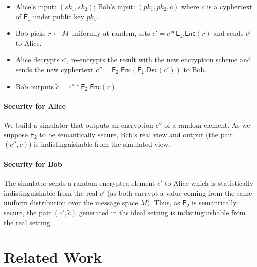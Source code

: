 \documentclass[11pt]{article}
\begin{document}
	\begin{itemize}
		\item Alice's input: $(sk_1,sk_2)$; Bob's input: $(pk_1,pk_2,c)$ where $c$ is a cyphertext of $\mathsf{E_1}$ under public key $pk_1$.
		   
		\item Bob picks $r \leftarrow M$ uniformly at random, sets $c' = c * \mathsf{E_1.Enc}(r)$ and sends $c'$ to Alice.
		
		\item Alice decrypts $c'$, re-encrypts the result with the new encryption scheme and sends the new cyphertext $c'' = \mathsf{E_2.Enc}(\mathsf{E_1.Dec}(c'))$ to Bob.
		
		\item Bob outputs $\tilde{c} = c'' * \mathsf{E_2.Enc}(r)$  
		
	\end{itemize}
	      
	\paragraph{Security for Alice}
 		We build a simulator that outputs an encryption $c''$ of a random element. As we suppose $\mathsf{E_2}$ to be semantically secure, Bob's real view and output (the pair $(c'',\tilde{c})$) is indistinguishable from the simulated view.

	\paragraph{Security for Bob}
		The simulator sends a random encrypted element $c'$ to Alice which is statistically indistinguishable from the real $c'$ (as both encrypt a value coming from the same uniform distribution over the message space $M$). Thus, as $\mathsf{E_2}$ is semantically secure, the pair $(c',\tilde{c})$  generated in the ideal setting is indistinguishable from the real setting.  




\section{Related Work} %
\label{sec:related_work}
        
\end{document}
